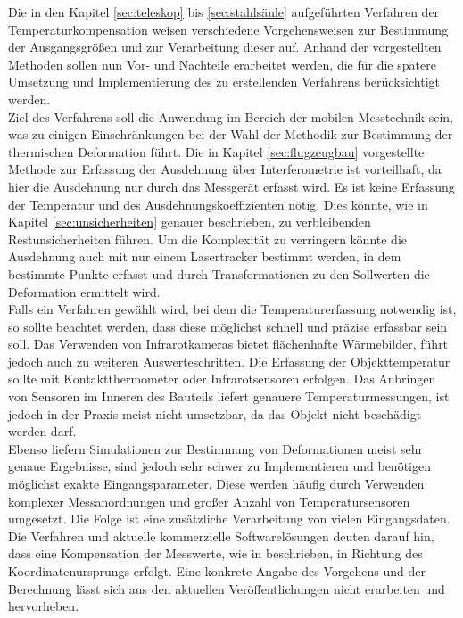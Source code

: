 Die in den Kapitel \ref{sec:teleskop} bis \ref{sec:stahlsäule} aufgeführten Verfahren der Temperaturkompensation weisen verschiedene Vorgehensweisen zur Bestimmung der Ausgangsgrößen und zur Verarbeitung dieser auf. Anhand der vorgestellten Methoden sollen nun Vor- und Nachteile erarbeitet werden, die für die spätere Umsetzung und Implementierung des zu erstellenden Verfahrens berücksichtigt werden.\\
Ziel des Verfahrens soll die Anwendung im Bereich der mobilen Messtechnik sein, was zu einigen Einschränkungen bei der Wahl der Methodik zur Bestimmung der thermischen Deformation führt. Die in Kapitel \ref{sec:flugzeugbau} vorgestellte Methode zur Erfassung der Ausdehnung über Interferometrie ist vorteilhaft, da hier die Ausdehnung nur durch das Messgerät erfasst wird. Es ist keine Erfassung der Temperatur und des Ausdehnungskoeffizienten nötig. Dies könnte, wie in Kapitel \ref{sec:unsicherheiten} genauer beschrieben, zu verbleibenden Restunsicherheiten führen. Um die Komplexität zu verringern könnte die Ausdehnung auch mit nur einem Lasertracker bestimmt werden, in dem bestimmte Punkte erfasst und durch Transformationen zu den Sollwerten die Deformation ermittelt wird.\\
Falls ein Verfahren gewählt wird, bei dem die Temperaturerfassung notwendig ist, so sollte beachtet werden, dass diese möglichst schnell und präzise erfassbar sein soll. Das Verwenden von Infrarotkameras bietet flächenhafte Wärmebilder, führt jedoch auch zu weiteren Auswerteschritten. Die Erfassung der Objekttemperatur sollte mit Kontaktthermometer oder Infrarotsensoren erfolgen. Das Anbringen von Sensoren im Inneren des Bauteils liefert genauere Temperaturmessungen, ist jedoch in der Praxis meist nicht umsetzbar, da das Objekt nicht beschädigt werden darf.\\
Ebenso liefern Simulationen zur Bestimmung von Deformationen meist sehr genaue Ergebnisse, sind jedoch sehr schwer zu Implementieren und benötigen möglichst exakte Eingangsparameter. Diese werden häufig durch Verwenden komplexer Messanordnungen und großer Anzahl von Temperatursensoren umgesetzt. Die Folge ist eine zusätzliche Verarbeitung von vielen Eingangsdaten.\\
Die Verfahren und aktuelle kommerzielle Softwarelösungen deuten darauf hin, dass eine Kompensation der Messwerte, wie in \cite{Hernla2013} beschrieben, in Richtung des Koordinatenursprungs erfolgt. Eine konkrete Angabe des Vorgehens und der Berechnung lässt sich aus den aktuellen Veröffentlichungen nicht erarbeiten und hervorheben.

